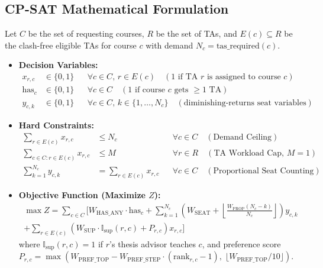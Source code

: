 \documentclass[12pt,a4paper]{article}
\begin{document}
\subsection{CP-SAT Mathematical Formulation}
Let $C$ be the set of requesting courses, $R$ be the set of TAs, and $E(c) \subseteq R$ be the clash-free eligible TAs for course $c$ with demand $N_c = \text{tas\_required}(c)$.

\begin{itemize}[leftmargin=*]
    \item \textbf{Decision Variables:}
    \begin{align*}
        x_{r,c} &\in \{0, 1\} && \forall c \in C,\, r \in E(c) \quad (\text{1 if TA } r \text{ is assigned to course } c) \\
        \text{has}_c &\in \{0, 1\} && \forall c \in C \quad (\text{1 if course } c \text{ gets } \ge 1 \text{ TA}) \\
        y_{c,k} &\in \{0, 1\} && \forall c \in C,\, k \in \{1, \dots, N_c\} \quad (\text{diminishing-returns seat variables})
    \end{align*}
    \item \textbf{Hard Constraints:}
    \begin{align*}
        \sum_{r \in E(c)} x_{r,c} &\le N_c && \forall c \in C \quad (\text{Demand Ceiling}) \\
        \sum_{c \in C : r \in E(c)} x_{r,c} &\le M && \forall r \in R \quad (\text{TA Workload Cap, } M=1) \\
        \sum_{k=1}^{N_c} y_{c,k} &= \sum_{r \in E(c)} x_{r,c} && \forall c \in C \quad (\text{Proportional Seat Counting})
    \end{align*}
    \item \textbf{Objective Function (Maximize $Z$):}
    \begin{multline*}
        \max Z = \sum_{c \in C} \Bigg[ W_{\text{HAS\_ANY}} \cdot \text{has}_c + \sum_{k=1}^{N_c} \left( W_{\text{SEAT}} + \left\lfloor \frac{W_{\text{PROP}}(N_c - k)}{N_c} \right\rfloor \right) y_{c,k} \\
        + \sum_{r \in E(c)} \left( W_{\text{SUP}} \cdot \mathbb{I}_{\text{sup}}(r,c) + P_{r,c} \right) x_{r,c} \Bigg]
    \end{multline*}
    where $\mathbb{I}_{\text{sup}}(r,c) = 1$ if $r$'s thesis advisor teaches $c$, and preference score $P_{r,c} = \max(W_{\text{PREF\_TOP}} - W_{\text{PREF\_STEP}} \cdot (\text{rank}_{r,c} - 1),\; \lfloor W_{\text{PREF\_TOP}}/10 \rfloor)$.
\end{itemize}
\end{document}

